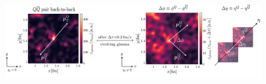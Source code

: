 \documentclass[aspectratio=169,11pt,usenames,dvipsnames]{beamer}
\begin{document}
\begin{frame}
\begin{center}
        \begin{figure}
            \centering
            \includegraphics[width=0.95\columnwidth]{images/sketch_quark_pair_evo_final.png}
        \end{figure}
    \end{center}
\end{frame}

\end{document}
